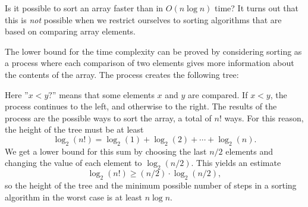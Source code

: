 Is it possible to sort an array faster
than in $O(n \log n)$ time?
It turns out that this is \emph{not} possible
when we restrict ourselves to sorting algorithms
that are based on comparing array elements.

The lower bound for the time complexity
can be proved by considering sorting
as a process where each comparison of two elements
gives more information about the contents of the array.
The process creates the following tree:

\begin{center}
\end{center}

Here ''$x<y?$'' means that some elements
$x$ and $y$ are compared.
If $x<y$, the process continues to the left,
and otherwise to the right.
The results of the process are the possible
ways to sort the array, a total of $n!$ ways.
For this reason, the height of the tree
must be at least
\[ \log_2(n!) = \log_2(1)+\log_2(2)+\cdots+\log_2(n).\]
We get a lower bound for this sum
by choosing the last $n/2$ elements and
changing the value of each element to $\log_2(n/2)$.
This yields an estimate
\[ \log_2(n!) \ge (n/2) \cdot \log_2(n/2),\]
so the height of the tree and the minimum
possible number of steps in a sorting
algorithm in the worst case
is at least $n \log n$.

